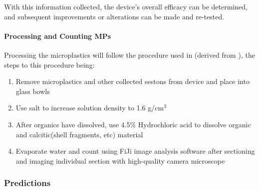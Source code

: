 \documentclass[fleqn,10pt]{SelfArx} %
\begin{document}
	With this information collected, the device’s overall efficacy can be determined, and subsequent improvements or alterations can be made and re-tested.
	
	\paragraph*{Processing and Counting MPs}
	Processing the microplastics will follow the procedure used in \cite{LenakerEtAlvertdist}(derived from \cite{Zobkov_Esiukova_2016}), the steps to this procedure being:
	\begin{enumerate}
		\item Remove microplastics and other collected \glspl{seston} from device and place into glass bowls 
		\item Use salt to increase solution density to 1.6 g/cm$^3$  
		\item After organics have dissolved, use 4.5\% Hydrochloric acid to dissolve organic and calcitic(shell fragments, etc) material
		\item Evaporate water and count using FiJi image analysis software after sectioning and imaging individual section with high-quality camera microscope
	\end{enumerate}
	
	\subsubsection{Predictions}
	\label{subsubsec:predictions}
\end{document}
